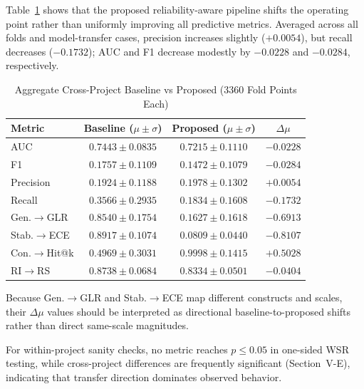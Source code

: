 \documentclass[conference]{IEEEtran}
\begin{document}
Table~\ref{tab:overall_cross} shows that the proposed reliability-aware pipeline shifts the operating point rather than uniformly improving all predictive metrics. Averaged across all folds and model-transfer cases, precision increases slightly (\(+0.0054\)), but recall decreases (\(-0.1732\)); AUC and F1 decrease modestly by \(-0.0228\) and \(-0.0284\), respectively.

\begin{table}[t]
\caption{Aggregate Cross-Project Baseline vs Proposed (3360 Fold Points Each)}
\label{tab:overall_cross}
\centering
\footnotesize
\setlength{\tabcolsep}{3.2pt}
\renewcommand{\arraystretch}{1.10}
\begin{tabular}{|l|c|c|c|}
\hline
\textbf{Metric} & \textbf{Baseline (\(\mu\pm\sigma\))} & \textbf{Proposed (\(\mu\pm\sigma\))} & \textbf{\(\Delta\mu\)} \\
\hline
AUC & \(0.7443\pm0.0835\) & \(0.7215\pm0.1110\) & \(-0.0228\) \\
\hline
F1 & \(0.1757\pm0.1109\) & \(0.1472\pm0.1079\) & \(-0.0284\) \\
\hline
Precision & \(0.1924\pm0.1188\) & \(0.1978\pm0.1302\) & \(+0.0054\) \\
\hline
Recall & \(0.3566\pm0.2935\) & \(0.1834\pm0.1608\) & \(-0.1732\) \\
\hline
Gen.\(\rightarrow\)GLR & \(0.8540\pm0.1754\) & \(0.1627\pm0.1618\) & \(-0.6913\) \\
\hline
Stab.\(\rightarrow\)ECE & \(0.8917\pm0.1074\) & \(0.0809\pm0.0440\) & \(-0.8107\) \\
\hline
Con.\(\rightarrow\)Hit@k & \(0.4969\pm0.3031\) & \(0.9998\pm0.1415\) & \(+0.5028\) \\
\hline
RI\(\rightarrow\)RS & \(0.8738\pm0.0684\) & \(0.8334\pm0.0501\) & \(-0.0404\) \\
\hline
\end{tabular}
\renewcommand{\arraystretch}{1.0}
\normalsize
\end{table}

Because Gen.\(\rightarrow\)GLR and Stab.\(\rightarrow\)ECE map different constructs and scales, their \(\Delta\mu\) values should be interpreted as directional baseline-to-proposed shifts rather than direct same-scale magnitudes.

For within-project sanity checks, no metric reaches \(p\le 0.05\) in one-sided WSR testing, while cross-project differences are frequently significant (Section~V-E), indicating that transfer direction dominates observed behavior.
\end{document}
